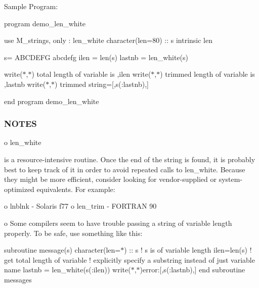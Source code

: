 Sample Program\+:

program demo\+\_\+len\+\_\+white

use M\+\_\+strings, only \+: len\+\_\+white character(len=80) \+:\+: s intrinsic len

s=\textquotesingle{} A\+B\+C\+D\+E\+FG abcdefg \textquotesingle{} ilen = len(s) lastnb = len\+\_\+white(s)

write($\ast$,$\ast$) \textquotesingle{}total length of variable is \textquotesingle{},ilen write($\ast$,$\ast$) \textquotesingle{}trimmed length of variable is \textquotesingle{},lastnb write($\ast$,$\ast$) \textquotesingle{}trimmed string=\mbox{[}\textquotesingle{},s(\+:lastnb),\textquotesingle{}\mbox{]}\textquotesingle{}

end program demo\+\_\+len\+\_\+white

\subsubsection*{N\+O\+T\+ES}

o len\+\_\+white \begin{DoxyVerb} is a resource-intensive routine. Once the end of
 the string is found, it is probably best to keep track of it in
 order to avoid repeated calls to len_white. Because they
 might be more efficient, consider looking for vendor-supplied or
 system-optimized equivalents. For example:

    o lnblnk - Solaris f77
    o len_trim - FORTRAN 90
\end{DoxyVerb}


o Some compilers seem to have trouble passing a string of variable length properly. To be safe, use something like this\+:

subroutine message(s) character(len=$\ast$) \+:\+: s ! s is of variable length ilen=len(s) ! get total length of variable ! explicitly specify a substring instead of just variable name lastnb = len\+\_\+white(s(\+:ilen)) write($\ast$,$\ast$)\textquotesingle{}error\+:\mbox{[}\textquotesingle{},s(\+:lastnb),\textquotesingle{}\mbox{]}\textquotesingle{} end subroutine messages \mbox{\label{namespacem__strings_a378563bb49f128bf0cf9c9d2b1f34498}} 
